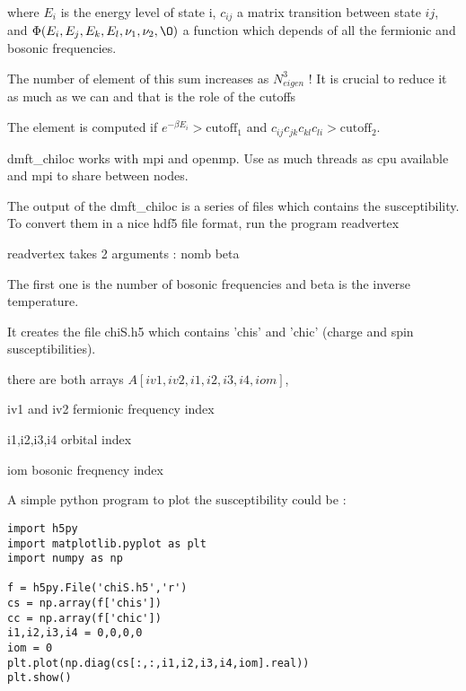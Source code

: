 \documentclass{book}
\def\b{\beta}
\def\v{\nu}
\begin{document}
\begin{enumerate}
where $E_i$ is the energy level of state i,  $c_{ij}$ a matrix transition between state $ij$, and  $ \Phi(E_i,E_j,E_k,E_l,\v_1,\v_2,\O)$ a function which depends of all the fermionic and bosonic frequencies.

The number of element of this sum increases as $N_{eigen}^3$ ! It is crucial to reduce it as much as we can and that is the role of the cutoffs

The element is computed if $e^{-\b E_i} >\text{cutoff}_1$ and $c_{ij}c_{jk}c_{kl}c_{li} >\text{cutoff}_2$.


dmft\_chiloc works with mpi and openmp. Use as much threads as cpu available  and mpi to share between nodes.


The output of the dmft\_chiloc is a series of files which contains the susceptibility. To convert them in a nice hdf5 file format, run the program readvertex

readvertex takes 2 arguments : nomb beta

The first one is the number of bosonic frequencies and   beta is  the inverse temperature.

It creates the file chiS.h5 which contains 'chis' and 'chic' (charge and spin susceptibilities).

there are both arrays $A[iv1,iv2,i1,i2,i3,i4,iom]$,

iv1 and iv2 fermionic frequency index

i1,i2,i3,i4 orbital index

iom bosonic freqnency index
\end{enumerate}


A simple python program to plot the susceptibility could be  :

\begin{lstlisting}
import h5py
import matplotlib.pyplot as plt
import numpy as np

f = h5py.File('chiS.h5','r')
cs = np.array(f['chis'])
cc = np.array(f['chic'])
i1,i2,i3,i4 = 0,0,0,0
iom = 0
plt.plot(np.diag(cs[:,:,i1,i2,i3,i4,iom].real))
plt.show()
\end{lstlisting}
\end{document}
